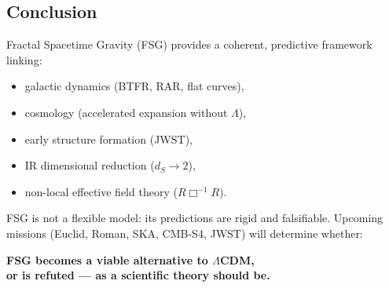 \documentclass[11pt,a4paper]{article}
\begin{document}
\begin{onehalfspacing}
\section{Conclusion}
Fractal Spacetime Gravity (FSG) provides a coherent, predictive framework
linking:
\begin{itemize}
    \item galactic dynamics (BTFR, RAR, flat curves),
    \item cosmology (accelerated expansion without $\Lambda$),
    \item early structure formation (JWST),
    \item IR dimensional reduction ($d_S\to2$),
    \item non-local effective field theory ($R\Box^{-1}R$).
\end{itemize}
FSG is not a flexible model:  
its predictions are rigid and falsifiable.  
Upcoming missions (Euclid, Roman, SKA, CMB-S4, JWST) will determine whether:
\begin{center}
\textbf{FSG becomes a viable alternative to $\Lambda$CDM,}\\[0.3em]
\textbf{or is refuted --- as a scientific theory should be.}
\end{center}
\newpage

\end{onehalfspacing}
\end{document}

